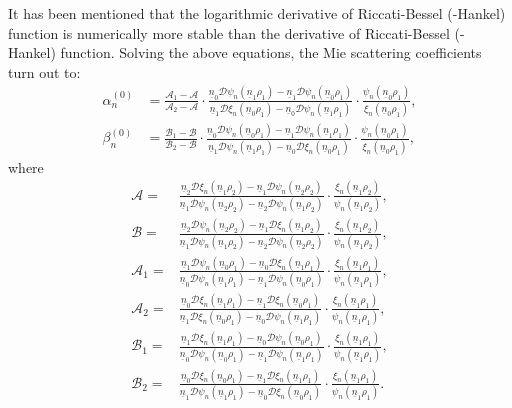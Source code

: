 \documentclass[journal=jacsat,manuscript=article,layout=traditional]{achemso}
\newcommand{\nr}{\underline{n}}
\begin{document}
It has been mentioned that the logarithmic derivative of Riccati-Bessel (-Hankel) function is numerically more stable than the derivative of Riccati-Bessel (-Hankel) function\cite{jia2016calculation}.
Solving the above equations, the Mie scattering coefficients turn out to:
\begin{subequations}
    \begin{align}
        \label{coreshell_alpha}
        \alpha_n^{(0)} &=
        \frac{\mathcal{A}_1-\mathcal{A}}{\mathcal{A}_2-\mathcal{A}}\cdot
        \frac{\nr_0\mathcal{D}\psi_n(\nr_1\rho_1)-\nr_1\mathcal{D}\psi_n(\nr_0\rho_1)}
        {\nr_1\mathcal{D}\xi_n(\nr_0\rho_1)-\nr_0\mathcal{D}\psi_n(\nr_1\rho_1)}\cdot
        \frac{\psi_n(\nr_0\rho_1)}{\xi_n(\nr_0\rho_1)},\\
        \label{coreshell_beta}
        \beta_n^{(0)} &=
        \frac{\mathcal{B}_1-\mathcal{B}}{\mathcal{B}_2-\mathcal{B}}\cdot
        \frac{\nr_0\mathcal{D}\psi_n(\nr_0\rho_1)-\nr_1\mathcal{D}\psi_n(\nr_1\rho_1)}
        {\nr_1\mathcal{D}\psi_n(\nr_1\rho_1)-\nr_0\mathcal{D}\xi_n(\nr_0\rho_1)}\cdot
        \frac{\psi_n(\nr_0\rho_1)}{\xi_n(\nr_0\rho_1)},
    \end{align}
    \label{coreshell}
\end{subequations}
where
\begin{subequations}
    \begin{align}
        \mathcal{A} =& \frac{\nr_2\mathcal{D}\xi_n(\nr_1\rho_2)-\nr_1\mathcal{D}\psi_n(\nr_2\rho_2)}
        {\nr_1\mathcal{D}\psi_n(\nr_2\rho_2)-\nr_2\mathcal{D}\psi_n(\nr_1\rho_2)}
        \cdot\frac{\xi_n(\nr_1\rho_2)}{\psi_n(\nr_1\rho_2)},\\
        \mathcal{B} =& \frac{\nr_2\mathcal{D}\psi_n(\nr_2\rho_2)-\nr_1\mathcal{D}\xi_n(\nr_1\rho_2)}
        {\nr_1\mathcal{D}\psi_n(\nr_1\rho_2)-\nr_2\mathcal{D}\psi_n(\nr_2\rho_2)}
        \cdot\frac{\xi_n(\nr_1\rho_2)}{\psi_n(\nr_1\rho_2)},\\
        \mathcal{A}_1 = & \frac{\nr_1\mathcal{D}\psi_n(\nr_0\rho_1)-\nr_0\mathcal{D}\xi_n(\nr_1\rho_1)}
        {\nr_0\mathcal{D}\psi_n(\nr_1\rho_1)-\nr_1\mathcal{D}\psi_n(\nr_0\rho_1)}
        \cdot\frac{\xi_n(\nr_1\rho_1)}{\psi_n(\nr_1\rho_1)},\\
        \mathcal{A}_2 = & \frac{\nr_0\mathcal{D}\xi_n(\nr_1\rho_1)-\nr_1\mathcal{D}\xi_n(\nr_0\rho_1)}
        {\nr_1\mathcal{D}\xi_n(\nr_0\rho_1)-\nr_0\mathcal{D}\psi_n(\nr_1\rho_1)}
        \cdot\frac{\xi_n(\nr_1\rho_1)}{\psi_n(\nr_1\rho_1)},\\
        \mathcal{B}_1 =& \frac{\nr_1\mathcal{D}\xi_n(\nr_1\rho_1)-\nr_0\mathcal{D}\psi_n(\nr_0\rho_1)}
        {\nr_0\mathcal{D}\psi_n(\nr_0\rho_1)-\nr_1\mathcal{D}\psi_n(\nr_1\rho_1)}
        \cdot\frac{\xi_n(\nr_1\rho_1)}{\psi_n(\nr_1\rho_1)},\\
        \mathcal{B}_2 =& \frac{\nr_0\mathcal{D}\xi_n(\nr_0\rho_1)-\nr_1\mathcal{D}\xi_n(\nr_1\rho_1)}
        {\nr_1\mathcal{D}\psi_n(\nr_1\rho_1)-\nr_0\mathcal{D}\xi_n(\nr_0\rho_1)}
        \cdot\frac{\xi_n(\nr_1\rho_1)}{\psi_n(\nr_1\rho_1)}.
    \end{align}    
\end{subequations}
\end{document}
